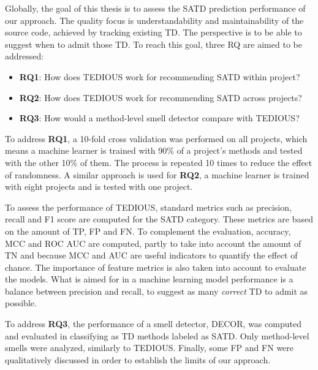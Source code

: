 Globally, the goal of this thesis is to assess the \ac{SATD} prediction performance of our approach. The quality focus is understandability and maintainability of the source code, achieved by tracking existing \ac{TD}. The perspective is to be able to suggest when to admit those \ac{TD}. To reach this goal, three \ac{RQ} are aimed to be addressed: 

\begin{itemize}
	\item \textbf{RQ1}: How does \ac{TEDIOUS} work for recommending \ac{SATD} within project?
	\item \textbf{RQ2}: How does \ac{TEDIOUS} work for recommending \ac{SATD} across projects?
	\item \textbf{RQ3}: How would a method-level smell detector compare with \ac{TEDIOUS}?
\end{itemize}

To address \textbf{RQ1}, a 10-fold cross validation was performed on all projects, which means a machine learner is trained with 90\% of a project's methods and tested with the other 10\% of them. The process is repeated 10 times to reduce the effect of randomness. A similar approach is used for \textbf{RQ2}, a machine learner is trained with eight projects and is tested with one project. \par

To assess the performance of \ac{TEDIOUS}, standard metrics such as precision, recall and F1 score are computed for the \ac{SATD} category. These metrics are based on the amount of \ac{TP}, \ac{FP} and \ac{FN}. To complement the evaluation, accuracy, \ac{MCC} and \ac{ROC} \ac{AUC} are computed, partly to take into account the amount of \ac{TN} and because \ac{MCC} and \ac{AUC} are useful indicators to quantify the effect of chance. The importance of feature metrics is also taken into account to evaluate the models. What is aimed for in a machine learning model performance is a balance between precision and recall, to suggest as many \emph{correct} \ac{TD} to admit as possible. \par

To address \textbf{RQ3}, the performance of a smell detector, \ac{DECOR}, was computed and evaluated in classifying as \ac{TD} methods labeled as \ac{SATD}. Only method-level smells were analyzed, similarly to \ac{TEDIOUS}. Finally, some \ac{FP} and \ac{FN} were qualitatively discussed in order to establish the limits of our approach. \par

